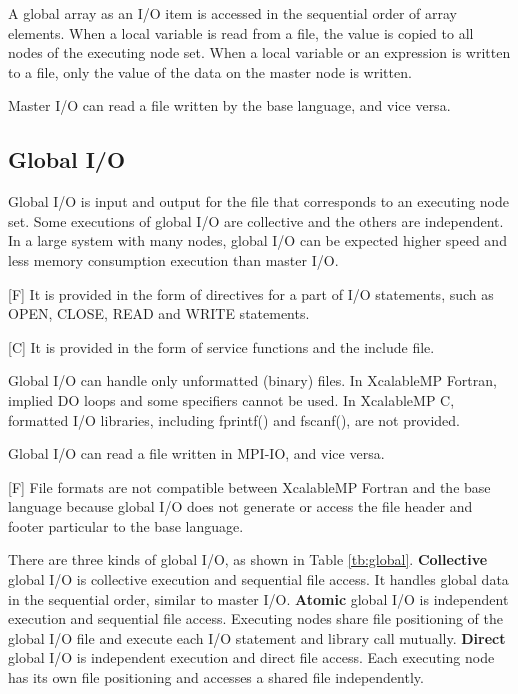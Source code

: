   A global array as an I/O item is accessed in the sequential order of
  array elements.
  When a local variable is read from a file, the value is copied to all
  nodes of the executing node set.
  When a local variable or an expression is written to a file, only the
  value of the data on the master node is written.
  
  Master I/O can read a file written by the base language, and vice
  versa.
  

  \subsection{Global I/O}

  Global I/O is input and output for the file that corresponds to
  an executing node set.
  Some executions of global I/O are collective and the others are independent.
  In a large system with many nodes, global I/O can be expected higher
  speed and less memory consumption execution than master I/O.

  [F] It is provided in the form of directives for a part of I/O
  statements, such as OPEN, CLOSE, READ
  and WRITE statements.

  [C] It is provided in the form of service functions and the include file.

  Global I/O can handle only unformatted (binary) files. In XcalableMP Fortran,
  implied DO loops and some specifiers cannot be used.
  In XcalableMP C, formatted I/O libraries, including fprintf() and fscanf(), are not provided.

  Global I/O can read a file written in MPI-IO, and vice versa. 

  [F] File formats are not compatible between XcalableMP Fortran
  and the base language because global I/O does not generate or access
  the file header and footer particular to the base language.

  There are three kinds of global I/O, as shown in Table
  \ref{tb:global}.
  {\bf Collective} global I/O is collective execution and
  sequential file access.
  It handles global data in the sequential order, similar to master
  I/O.
  {\bf Atomic} global I/O is independent execution and sequential file access.
  Executing nodes share file positioning of the global I/O file and
  execute each I/O statement and library call mutually.
  {\bf Direct} global I/O is independent execution and direct file access.
  Each executing node has its own file positioning and accesses a shared
  file independently.

